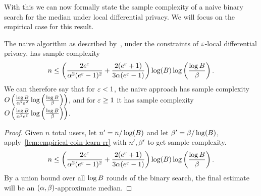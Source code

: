 With this we can now formally state the sample complexity of a naive binary search for the median under local differential privacy. We will focus on the empirical case for this result. 
\begin{theorem}
\label{thm:ldp-nbs-naive}
    The naive algorithm as described by~\citet{karp2007noisy}, under the constraints of $\varepsilon$-local differential privacy, has sample complexity
    \[
    n\leq \left( \frac{2e^\varepsilon}{\alpha^2(e^\varepsilon - 1)^2} + \frac{2(e^\varepsilon + 1)}{3\alpha(e^\varepsilon - 1)} \right)\log(B)\log\left(\frac{\log B}{\beta}\right).
    \]
    We can therefore say that for $\varepsilon<1$, the naive approach has sample complexity $O\left(\frac{\log B}{\alpha^2\varepsilon^2}\log\left(\frac{\log B}{\beta}\right)\right)$, and for $\varepsilon\geq 1$ it has sample complexity $O\left(\frac{\log B}{\alpha^2e^\varepsilon}\log\left(\frac{\log B}{\beta}\right)\right)$.
\end{theorem}
\begin{proof}
    Given $n$ total users, let $n'=n/\log(B)$ and let $\beta'=\beta/\log(B)$, apply~\autoref{lem:empirical-coin-learn-rr} with $n',\beta'$ to get sample complexity.
    \[
    n\leq \left( \frac{2e^\varepsilon}{\alpha^2(e^\varepsilon - 1)^2} + \frac{2(e^\varepsilon + 1)}{3\alpha(e^\varepsilon - 1)} \right)\log(B)\log\left(\frac{\log B}{\beta}\right).
    \]
    By a union bound over all $\log B$ rounds of the binary search, the final estimate will be an $(\alpha,\beta)$-approximate median.
\end{proof}

